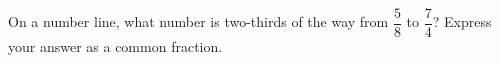 On a number line, what number is two-thirds of the way from $\dfrac58$ to $\dfrac74$? Express your answer as a common fraction.
